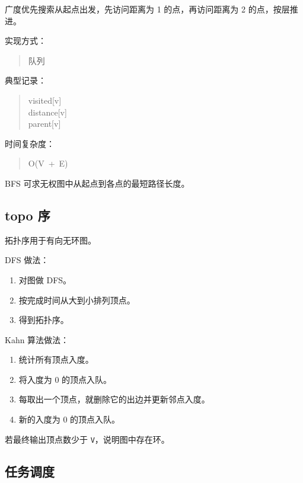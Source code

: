 \documentclass[UTF8,zihao=-4]{ctexart}
\begin{document}
广度优先搜索从起点出发，先访问距离为 1 的点，再访问距离为 2 的点，按层推进。

实现方式：

\begin{quote}
\small\ttfamily\raggedright
\relax 队列\\
\end{quote}

典型记录：

\begin{quote}
\small\ttfamily\raggedright
\relax visited[v]\\
\relax distance[v]\\
\relax parent[v]\\
\end{quote}

时间复杂度：

\begin{quote}
\small\ttfamily\raggedright
\relax O(V\ +\ E)\\
\end{quote}

BFS 可求无权图中从起点到各点的最短路径长度。

\subsection*{topo 序}

拓扑序用于有向无环图。

DFS 做法：

\begin{enumerate}
\item 对图做 DFS。
\item 按完成时间从大到小排列顶点。
\item 得到拓扑序。
\end{enumerate}

Kahn 算法做法：

\begin{enumerate}
\item 统计所有顶点入度。
\item 将入度为 0 的顶点入队。
\item 每取出一个顶点，就删除它的出边并更新邻点入度。
\item 新的入度为 0 的顶点入队。
\end{enumerate}

若最终输出顶点数少于 \texttt{V}，说明图中存在环。

\subsection*{任务调度}
\end{document}
